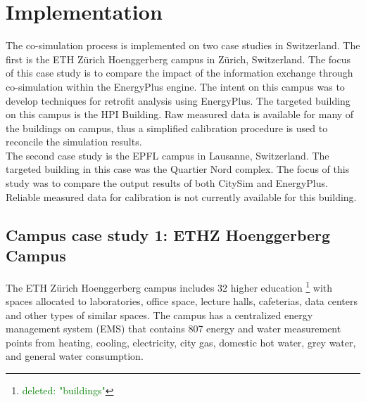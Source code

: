 \documentclass{tBPS2e}
\theoremstyle{plain}
\theoremstyle{definition}
\theoremstyle{remark}
\newcommand{\noteDT}[1]{\footnote{\textcolor{green}{#1}}}
\begin{document}

 
\section{Implementation}\label{Implementation and results}
The co-simulation process is implemented on two case studies in Switzerland. The first is the ETH Z\"urich Hoenggerberg campus in Z\"urich, Switzerland. The focus of this case study is to compare the impact of the information exchange through co-simulation within the EnergyPlus engine. The intent on this campus was to develop techniques for retrofit analysis using EnergyPlus. The targeted building on this campus is the HPI Building. Raw measured data is available for many of the buildings on campus, thus a simplified calibration procedure is used to reconcile the simulation results.\\

The second case study is the EPFL campus in Lausanne, Switzerland. The targeted building in this case was the Quartier Nord complex. The focus of this study was to compare the output results of both CitySim and EnergyPlus. Reliable measured data for calibration is not currently available for this building.

\subsection{Campus case study 1: ETHZ Hoenggerberg Campus}
The ETH Z\"urich Hoenggerberg campus includes 32 higher education \noteDT{deleted: "buildings"} with spaces allocated to laboratories, office space, lecture halls, cafeterias, data centers and other types of similar spaces. The campus has a centralized energy management system (EMS) that contains 807 energy and water measurement points from heating, cooling, electricity, city gas, domestic hot water, grey water, and general water consumption. 
\end{document}
